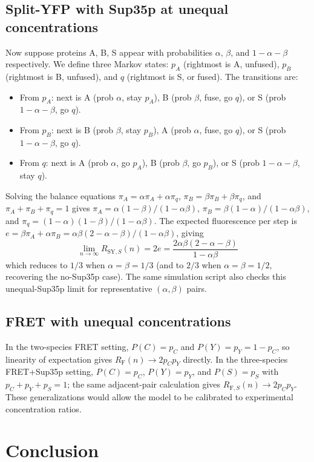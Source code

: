 \documentclass[11pt]{article}
\begin{document}
\subsection{Split-YFP with Sup35p at unequal concentrations}\label{subsec:unequal-sup35}
Now suppose proteins A, B, S appear with probabilities $\alpha$, $\beta$, and $1 - \alpha - \beta$ respectively. We define three Markov states: $p_A$ (rightmost is A, unfused), $p_B$ (rightmost is B, unfused), and $q$ (rightmost is S, or fused). The transitions are:
\begin{itemize}
\item From $p_A$: next is A (prob $\alpha$, stay $p_A$), B (prob $\beta$, fuse, go $q$), or S (prob $1{-}\alpha{-}\beta$, go $q$).
\item From $p_B$: next is B (prob $\beta$, stay $p_B$), A (prob $\alpha$, fuse, go $q$), or S (prob $1{-}\alpha{-}\beta$, go $q$).
\item From $q$: next is A (prob $\alpha$, go $p_A$), B (prob $\beta$, go $p_B$), or S (prob $1{-}\alpha{-}\beta$, stay $q$).
\end{itemize}
Solving the balance equations $\pi_A = \alpha\pi_A + \alpha\pi_q$, $\pi_B = \beta\pi_B + \beta\pi_q$, and $\pi_A + \pi_B + \pi_q = 1$ gives $\pi_A = \alpha(1-\beta)/(1 - \alpha\beta)$, $\pi_B = \beta(1-\alpha)/(1 - \alpha\beta)$, and $\pi_q = (1-\alpha)(1-\beta)/(1-\alpha\beta)$. The expected fluorescence per step is $e = \beta\pi_A + \alpha\pi_B = \alpha\beta(2 - \alpha - \beta)/(1 - \alpha\beta)$, giving
\[
\lim_{n \to \infty} R_{\text{SY},S}(n) = 2e = \frac{2\alpha\beta(2 - \alpha - \beta)}{1 - \alpha\beta}
\]
which reduces to $1/3$ when $\alpha = \beta = 1/3$ (and to $2/3$ when $\alpha = \beta = 1/2$, recovering the no-Sup35p case).
The same simulation script also checks this unequal-Sup35p limit for representative $(\alpha,\beta)$ pairs.

\subsection{FRET with unequal concentrations}
In the two-species FRET setting, $P(C)=p_C$ and $P(Y)=p_Y=1-p_C$, so linearity of expectation gives $R_{\text{F}}(n) \to 2p_Cp_Y$ directly. In the three-species FRET+Sup35p setting, $P(C)=p_C$, $P(Y)=p_Y$, and $P(S)=p_S$ with $p_C+p_Y+p_S=1$; the same adjacent-pair calculation gives $R_{\text{F},S}(n)\to 2p_Cp_Y$. These generalizations would allow the model to be calibrated to experimental concentration ratios.

\section{Conclusion}
\end{document}
